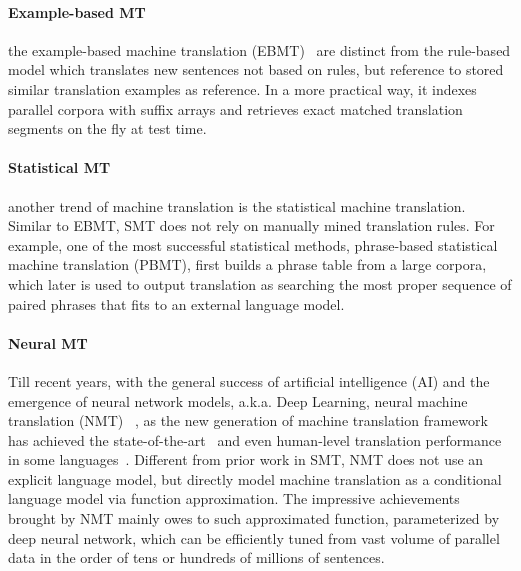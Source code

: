 \paragraph{Example-based MT}
the example-based machine translation (EBMT)~\citep{Zhang2005AnEP,callison2005scaling,phillips2012modeling} are distinct from the rule-based model which translates new sentences not based on rules, but reference to stored similar translation examples as reference. In a more practical way, it indexes parallel corpora with suffix arrays and retrieves exact matched translation segments on the fly at test time. %


\paragraph{Statistical MT} another trend of machine translation is the statistical machine translation. Similar to EBMT, SMT does not rely on manually mined translation rules. For example, one of the most successful statistical methods,  phrase-based statistical machine translation (PBMT), first builds a phrase table from a large corpora, which later is used to output translation as searching the most proper sequence of paired phrases that fits to an external language model.

\paragraph{Neural MT}
Till recent years, with the general success of artificial intelligence (AI) and the emergence of neural network models, a.k.a. Deep Learning, neural machine translation (NMT)~\cite{sutskever2014sequence,bahdanau2014neural,vaswani2017attention} , as the new generation of machine translation framework has achieved the state-of-the-art~\cite{wu2016google} and even human-level translation performance in some languages~\cite{hassan-hp}.
Different from prior work in SMT, NMT does not use an explicit language model, but directly model machine translation as a conditional language model via function approximation.  
The impressive achievements brought by NMT mainly owes to such approximated function, parameterized by deep neural network, 
which can be efficiently tuned from vast volume of parallel data in the order of tens or hundreds of millions of sentences. 

